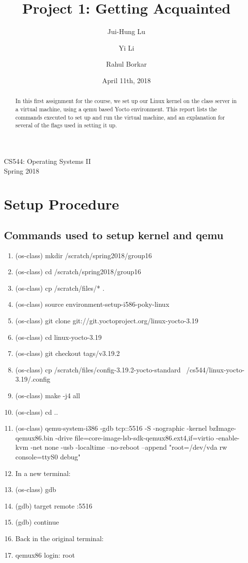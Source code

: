 \documentclass[onecolumn, draftclsnofoot,10pt, compsoc]{IEEEtran}
\title{Project 1: Getting Acquainted}
\author{
  Jui-Hung Lu \hspace{1cm}
  \and
  Yi Li \hspace{1cm}
  \and
  Rahul Borkar
}
\date{April 11th, 2018}
\begin{document}
\begin{titlepage}

\maketitle
\begin{center}
CS544: Operating Systems II \\
Spring 2018
\vspace{50 mm}
\end{center}
\begin{abstract}
In this first assignment for the course, we set up our Linux kernel on the class server in a virtual machine, using a qemu based Yocto environment. This report lists the commands executed to set up and run the virtual machine, and an explanation for several of the flags used in setting it up. 
\end{abstract}
\end{titlepage}
\section{Setup Procedure}
\subsection{Commands used to setup kernel and qemu}
\begin{enumerate}
\item (os-class) mkdir /scratch/spring2018/group16
\item (os-class) cd /scratch/spring2018/group16
\item (os-class) cp /scratch/files/* .
\item (os-class) source environment-setup-i586-poky-linux
\item (os-class) git clone git://git.yoctoproject.org/linux-yocto-3.19
\item (os-class) cd linux-yocto-3.19
\item (os-class) git checkout tags/v3.19.2
\item (os-class) cp /scratch/files/config-3.19.2-yocto-standard ~/cs544/linux-yocto-3.19/.config
\item (os-class) make -j4 all
\item (os-class) cd ..
\item (os-class) qemu-system-i386 -gdb tcp::5516 -S -nographic -kernel bzImage-qemux86.bin -drive file=core-image-lsb-sdk-qemux86.ext4,if=virtio -enable-kvm -net none -usb -localtime --no-reboot --append "root=/dev/vda rw console=ttyS0 debug"
\item In a new terminal:
\item (os-class) gdb
\item (gdb) target remote :5516
\item (gdb) continue
\item Back in the original terminal:
\item qemux86 login: root
\end{enumerate}
\end{document}
